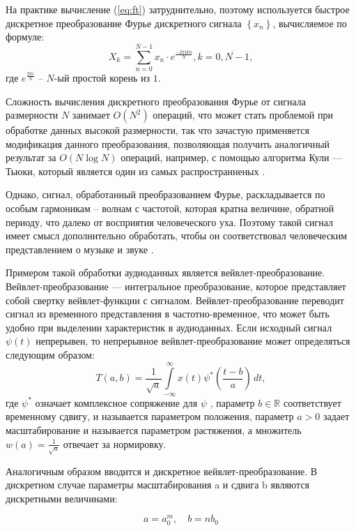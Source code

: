 На практике вычисление (\ref{eq:ft}) затруднительно, поэтому используется быстрое дискретное преобразование Фурье дискретного сигнала $\left\{x_n\right\}$, вычисляемое по формуле:
\begin{equation}
	X_k = \sum_{n=0}^{N-1} x_n \cdot e^\frac{-2\pi i kn}{N}, k=\overline{0, N-1},
\end{equation}
где $e^{\frac{2\pi i}{N}}$ -- $N$-ый простой корень из $1$.

Сложность вычисления дискретного преобразования Фурье от сигнала размерности $N$ занимает $O(N^2)$ операций, что может стать проблемой при обработке
данных высокой размерности, так что зачастую применяется модификация данного преобразования, позволяющая получить аналогичный результат
за $O(N\log N )$ операций, например, с помощью алгоритма Кули — Тьюки, который является один из самых распространненых \cite{fft}.

Однако, сигнал, обработанный преобразованием Фурье, раскладывается по особым гармоникам -- волнам с частотой, которая кратна величине, обратной периоду, что далеко от восприятия человеческого уха.
Поэтому такой сигнал имеет смысл дополнительно обработать, чтобы он соответствовал человеческим представлением о музыке и звуке \cite{cyber_zub}.

Примером такой обработки аудиоданных является вейвлет-преобразование.
Вейвлет-преобразование — интегральное преобразование, которое представляет собой свертку вейвлет-функции с сигналом.
Вейвлет-преобразование переводит сигнал из временного представления в частотно-временное, что может быть удобно при выделении характеристик
в аудиоданных. Если исходный сигнал $\psi(t)$ непрерывен, то непрерывное вейвлет-преобразование может определяться
следующим образом:
\begin{equation}
	T(a,b)={\frac {1}{{\sqrt {a}}}}\int \limits _{{-\infty }}^{{\infty }}x(t)\psi ^{*}\left({\frac {t-b}{a}}\right)\,dt,
\end{equation} где
${\psi }^{*}$ означает комплексное сопряжение для $\psi$ , параметр $b\in \mathbb{R}$ соответствует временному сдвигу, 
и называется параметром положения, параметр $a > 0$ задает масштабирование и называется параметром растяжения, а множитель  $w(a) = \frac{1}{\sqrt{a}}$ отвечает за нормировку.

Аналогичным образом вводится и дискретное вейвлет-преобразование.
В дискретном случае параметры масштабирования a и сдвига b являются дискретными величинами:

$$a=a_{0}^{m},\quad b=nb_{0}$$

